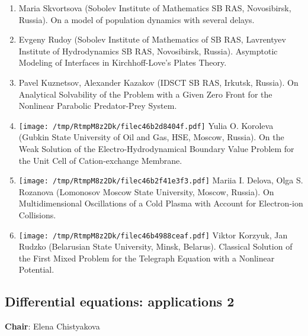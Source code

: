 \documentclass[
]{article}
\providecommand{\tightlist}{%
  \setlength{\itemsep}{0pt}\setlength{\parskip}{0pt}}
\begin{document}
\begin{enumerate}
\def\labelenumi{\arabic{enumi}.}
\tightlist
\item
  Maria Skvortsova (Sobolev Institute of Mathematics SB RAS,
  Novosibirsk, Russia). On a model of population dynamics with several
  delays.
\item
  Evgeny Rudoy (Sobolev Institute of Mathematics of SB RAS, Lavrentyev
  Institute of Hydrodynamics SB RAS, Novosibirsk, Russia). Asymptotic
  Modeling of Interfaces in Kirchhoff-Love's Plates Theory.
\item
  Pavel Kuznetsov, Alexander Kazakov (IDSCT SB RAS, Irkutsk, Russia). On
  Analytical Solvability of the Problem with a Given Zero Front for the
  Nonlinear Parabolic Predator-Prey System.
\item
  \protect\texttt{[image: /tmp/RtmpM8z2Dk/filec46b2d8404f.pdf]}
  Yulia O. Koroleva (Gubkin State University of Oil and Gas, HSE,
  Moscow, Russia). On the Weak Solution of the Electro-Hydrodynamical
  Boundary Value Problem for the Unit Cell of Cation-exchange Membrane.
\item
  \protect\texttt{[image: /tmp/RtmpM8z2Dk/filec46b2f41e3f3.pdf]}
  Mariia I. Delova, Olga S. Rozanova (Lomonosov Moscow State University,
  Moscow, Russia). On Multidimensional Oscillations of a Cold Plasma
  with Account for Electron-ion Collisions.
\item
  \protect\texttt{[image: /tmp/RtmpM8z2Dk/filec46b4988ceaf.pdf]}
  Viktor Korzyuk, Jan Rudzko (Belarusian State University, Minsk,
  Belarus). Classical Solution of the First Mixed Problem for the
  Telegraph Equation with a Nonlinear Potential.
\end{enumerate}

\hypertarget{dea2}{%
\subsection{Differential equations: applications 2}\label{dea2}}

\textbf{Chair}: Elena Chistyakova
\end{document}
